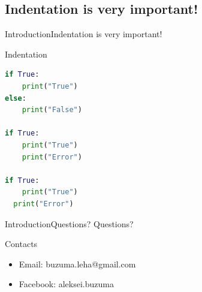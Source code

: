 \documentclass[10pt]{beamer}
\begin{document}
\subsection{Indentation is very important!}



\begin{frame}[fragile]{Introduction}{Indentation is very important!}
	
\begin{block}{Indentation}
	
\begin{lstlisting}[language=Python, tabsize=4, showspaces=true, showtabs=true]
if True:
    print("True")
else:
    print("False")

if True:
	print("True")
    print("Error")

if True:
    print("True")
  print("Error")
\end{lstlisting}

\end{block}	
	
\end{frame}


\begin{frame}{Introduction}{Questions?}
	\large Questions?
	\begin{center}
		
		\begin{block}{Contacts}
			\begin{itemize}
				\item Email:    buzuma.leha@gmail.com
				\item Facebook: aleksei.buzuma
			\end{itemize}
		\end{block}
		
	\end{center}
\end{frame}
\end{document}
